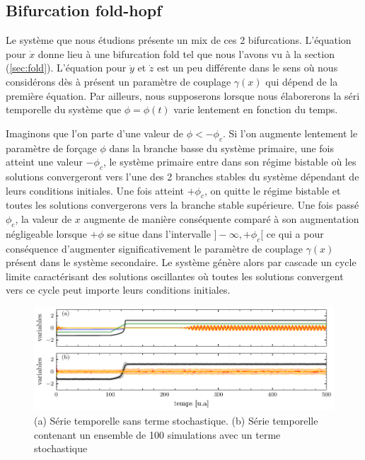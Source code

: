 \subsection{Bifurcation fold-hopf}

Le système que nous étudions présente un mix de ces 2 bifurcations. L'équation pour $\dot{x}$ donne lieu à une bifurcation fold tel que nous l'avons vu à la section (\ref{sec:fold}). L'équation pour $\dot{y}$ et $\dot{z}$ est un peu différente dans le sens où nous considérons dès à présent un paramètre de couplage $\gamma(x)$ qui dépend de la première équation. Par ailleurs, nous supposerons lorsque nous élaborerons la séri temporelle du système que $\phi = \phi(t)$ varie lentement en fonction du temps.


Imaginons que l’on parte d’une valeur de $\phi < - \phi_c$. Si l’on augmente lentement le paramètre de forçage $\phi$ dans la branche basse du système primaire, une fois atteint une valeur $-\phi_c$, le système primaire entre dans son régime bistable où les solutions convergeront vers l’une des 2 branches stables du système dépendant de leurs conditions initiales. Une fois atteint $+\phi_c$, on quitte le régime bistable et toutes les solutions convergerons vers la branche stable supérieure. Une fois passé $\phi_c$, la valeur de $x$ augmente de manière conséquente comparé à son augmentation négligeable lorsque $+\phi$ se situe dans l’intervalle $]-\infty, +\phi_c[$ ce qui a pour conséquence d’augmenter significativement le paramètre de couplage $\gamma(x)$ présent dans le système secondaire. Le système génère alors par cascade un cycle limite caractérisant des solutions oscillantes où toutes les solutions convergent vers ce cycle peut importe leurs conditions initiales.

\begin{figure}[ht!]
  \centering
  \includegraphics{figures/time-series.pdf}
  \caption{(a) Série temporelle sans terme stochastique. (b) Série temporelle contenant un ensemble de 100 simulations avec un terme stochastique}
  \label{fig:time-series}
\end{figure}

